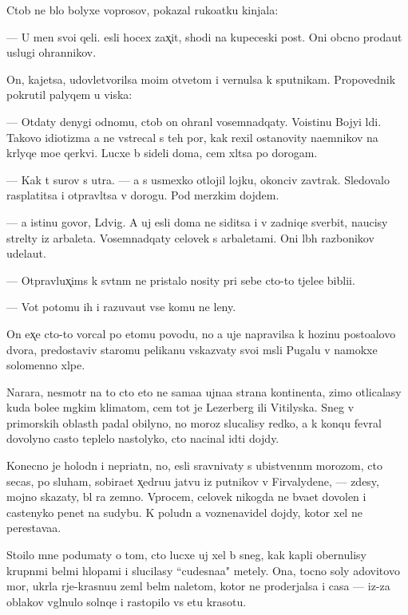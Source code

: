 \documentclass[10pt]{book}
\begin{document}
Ctob{\yi} ne b{\yi}lo bolyxe voprosov, pokazal ruko{\y}atku kinjala:

— U men{\ia} svo{\y}i qeli. {\Y}esli hocex zax̨it{\yi}, shodi na kupeceski{\y} post. Oni ob{\yi}cno proda{\y}ut uslugi ohrannikov.

On, kajetsa, udovletvorilsa mo{\y}im otvetom i vernulsa k sputnikam. Propovednik pokrutil palyqem u viska:

— Otdaty denygi odnomu, ctob{\yi} on ohran{\ia}l vosemnadqaty. Vo{\y}istinu Bojyi l{\iu}di. Takovo idiotizma {\y}a ne vstrecal s teh por, kak rexil ostanovity na{\y}emnikov na kr{\yi}lyqe mo{\y}e{\y} qerkvi. Lucxe b{\yi} sideli doma, cem xl{\ia}tsa po dorogam.

— Kak t{\yi} surov s utra. — {\Y}a s usmexko{\y} otlojil lojku, okonciv zavtrak. Sledovalo rasplatitsa i otpravl{\ia}tsa v dorogu. Pod merzkim dojdem.

— {\Y}a istinu govor{\iu}, L{\iu}dvig. A uj {\y}esli doma ne siditsa i v zadniqe sverbit, naucisy strel{\ia}ty iz arbaleta. Vosemnadqaty celovek s arbaletami. Oni l{\iu}b{\yi}h razbo{\y}nikov udela{\y}ut.

— Otpravl{\ia}{\y}ux̨ims{\ia} k sv{\ia}t{\yi}n{\ia}m ne pristalo nosity pri sebe cto-to t{\ia}jele{\y}e bibli{\y}i.

— Vot potomu ih i razuva{\y}ut vse komu ne leny.

On {\y}ex̨e cto-to vorcal po etomu povodu, no {\y}a uje napravilsa k hoz{\ia}{\y}inu posto{\y}alovo dvora, predostaviv staromu pelikanu v{\yi}skaz{\yi}vaty svo{\y}i m{\yi}sli Pugalu v namokxe{\y} solomenno{\y} xl{\ia}pe.



Narara, nesmotr{\ia} na to cto eto ne sama{\y}a {\y}ujna{\y}a strana kontinenta, zimo{\y} otlicalasy kuda bole{\y}e m{\ia}gkim klimatom, cem tot je Lezerberg ili Vitilyska. Sneg v primorskih oblast{\ia}h padal obilyno, no moroz{\yi} slucalisy redko, a k konqu fevral{\ia} dovolyno casto teplelo nastolyko, cto nacinal idti dojdy.

Konecno je holodn{\yi}{\y} i nepri{\y}atn{\yi}{\y}, no, {\y}esli sravnivaty s ubi{\y}stvenn{\yi}m morozom, cto se{\y}cas, po sluham, sobira{\y}et x̨edru{\y}u jatvu iz putnikov v Firvalydene, — zdesy, mojno skazaty, b{\yi}l ra{\y} zemno{\y}. Vprocem, celovek nikogda ne b{\yi}va{\y}et dovolen i castenyko pen{\ia}{\y}et na sudybu. K poludn{\iu} {\y}a voznenavidel dojdy, kotor{\yi}{\y} xel ne perestava{\y}a.

Sto{\y}ilo mne podumaty o tom, cto lucxe uj xel b{\yi} sneg, kak kapli obernulisy krupn{\yi}mi bel{\yi}mi hlop{\y}ami i slucilasy ``cudesna{\y}a" metely. Ona, tocno soly {\Y}adovitovo mor{\ia}, ukr{\yi}la r{\yi}je-krasnu{\y}u zeml{\iu} bel{\yi}m naletom, kotor{\yi}{\y} ne proderjalsa i casa — iz-za oblakov v{\yi}gl{\ia}nulo solnqe i rastopilo vs{\iu} etu krasotu.
\end{document}
